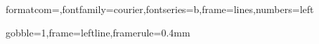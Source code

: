 \newcommand{\question}[3][true]{%
	\refstepcounter{questioncount}%
	\par \questionlabel #2
	\marginpar{%
		\textcolor{black}{%
			\IfFileExists{\scorefile}{%
				\href{\scorefile}{%
					\color{red}%
					\raisebox{0pt}{\includescore}/ #3%
				}%
			}{%
				\hspace{0.5cm}/#3%
			}%
		}%
	}%
	\ifthenelse{\boolean{#1}}{%
		\esolution%
	}{}%
}

%
%
%
%


%	
%	
%	
%	
%	






{formatcom=\color{blue},fontfamily=courier,fontseries=b,frame=lines,numbers=left}

{gobble=1,frame=leftline,framerule=0.4mm}



\newcommand{\wifi}{IEEE 802.11\xspace}

\renewcommand{\rmdefault}{phv}
\renewcommand{\sfdefault}{phv}

\setlength{\parskip}{10pt plus 1pt minus 1pt}

